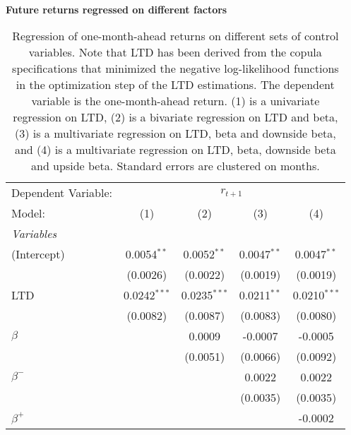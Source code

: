 \begin{table}[H]
\caption{\\ \large{\textbf{Future returns regressed on different factors}}}
\captionsetup{justification = justified, width = \linewidth}
\caption*{Regression of one-month-ahead returns on different
                               sets of control variables. Note that LTD has been derived from the 
                               copula specifications that minimized the negative log-likelihood functions
                               in the optimization step of the LTD estimations. The dependent variable is
                               the one-month-ahead return. (1) is a univariate regression
                               on LTD, (2) is a bivariate regression on LTD and beta,
                               (3) is a multivariate regression on LTD, beta and downside 
                               beta, and (4) is a multivariate regression on LTD, beta,
                               downside beta and upside beta. Standard errors are clustered
                               on months.}
   \centering
\label{reg_clustered_on_time_1_ltd_nll}
   \begin{tabular}{lcccc}
      \tabularnewline \midrule \midrule
      Dependent Variable: & \multicolumn{4}{c}{$r_{t+1}$}\\
      Model:         & (1)            & (2)            & (3)           & (4)\\  
      \midrule
      \emph{Variables}\\
      (Intercept)    & 0.0054$^{**}$  & 0.0052$^{**}$  & 0.0047$^{**}$ & 0.0047$^{**}$\\   
                     & (0.0026)       & (0.0022)       & (0.0019)      & (0.0019)\\   
      LTD            & 0.0242$^{***}$ & 0.0235$^{***}$ & 0.0211$^{**}$ & 0.0210$^{***}$\\   
                     & (0.0082)       & (0.0087)       & (0.0083)      & (0.0080)\\   
      $\beta$        &                & 0.0009         & -0.0007       & -0.0005\\   
                     &                & (0.0051)       & (0.0066)      & (0.0092)\\   
      $\beta^{-}$    &                &                & 0.0022        & 0.0022\\   
                     &                &                & (0.0035)      & (0.0035)\\   
      $\beta^{+}$    &                &                &               & -0.0002\\   

\end{tabular}
\end{table}
